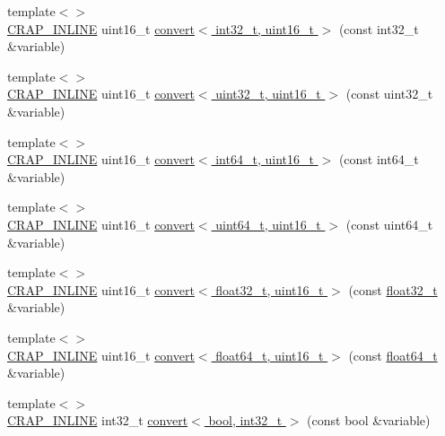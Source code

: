 \begin{DoxyCompactItemize}
\item 
{\footnotesize template$<$$>$ }\\\hyperlink{config__x86_8h_a5a40526b8d842e7ff731509998bb0f1c}{C\+R\+A\+P\+\_\+\+I\+N\+L\+I\+N\+E} uint16\+\_\+t \hyperlink{namespacecrap_ab0c5e4fcb0103590493bdf74633c99b4}{convert$<$ int32\+\_\+t, uint16\+\_\+t $>$} (const int32\+\_\+t \&variable)
\item 
{\footnotesize template$<$$>$ }\\\hyperlink{config__x86_8h_a5a40526b8d842e7ff731509998bb0f1c}{C\+R\+A\+P\+\_\+\+I\+N\+L\+I\+N\+E} uint16\+\_\+t \hyperlink{namespacecrap_a2c124aff19ec54020d9f90295ce56b55}{convert$<$ uint32\+\_\+t, uint16\+\_\+t $>$} (const uint32\+\_\+t \&variable)
\item 
{\footnotesize template$<$$>$ }\\\hyperlink{config__x86_8h_a5a40526b8d842e7ff731509998bb0f1c}{C\+R\+A\+P\+\_\+\+I\+N\+L\+I\+N\+E} uint16\+\_\+t \hyperlink{namespacecrap_a508dd2b9a4e2635d78d9ea03b7625169}{convert$<$ int64\+\_\+t, uint16\+\_\+t $>$} (const int64\+\_\+t \&variable)
\item 
{\footnotesize template$<$$>$ }\\\hyperlink{config__x86_8h_a5a40526b8d842e7ff731509998bb0f1c}{C\+R\+A\+P\+\_\+\+I\+N\+L\+I\+N\+E} uint16\+\_\+t \hyperlink{namespacecrap_a0823edb57f60d854502e8657336885c7}{convert$<$ uint64\+\_\+t, uint16\+\_\+t $>$} (const uint64\+\_\+t \&variable)
\item 
{\footnotesize template$<$$>$ }\\\hyperlink{config__x86_8h_a5a40526b8d842e7ff731509998bb0f1c}{C\+R\+A\+P\+\_\+\+I\+N\+L\+I\+N\+E} uint16\+\_\+t \hyperlink{namespacecrap_a46867334dcd3612b887bc34782c0992d}{convert$<$ float32\+\_\+t, uint16\+\_\+t $>$} (const \hyperlink{crap__types_8h_a4611b605e45ab401f02cab15c5e38715}{float32\+\_\+t} \&variable)
\item 
{\footnotesize template$<$$>$ }\\\hyperlink{config__x86_8h_a5a40526b8d842e7ff731509998bb0f1c}{C\+R\+A\+P\+\_\+\+I\+N\+L\+I\+N\+E} uint16\+\_\+t \hyperlink{namespacecrap_a188e5ce3c38547ceb32c29c98355d2ae}{convert$<$ float64\+\_\+t, uint16\+\_\+t $>$} (const \hyperlink{crap__types_8h_ac55f3ae81b5bc9053760baacf57e47f4}{float64\+\_\+t} \&variable)
\item 
{\footnotesize template$<$$>$ }\\\hyperlink{config__x86_8h_a5a40526b8d842e7ff731509998bb0f1c}{C\+R\+A\+P\+\_\+\+I\+N\+L\+I\+N\+E} int32\+\_\+t \hyperlink{namespacecrap_ae4a5dec504507fdfb398209926179fd0}{convert$<$ bool, int32\+\_\+t $>$} (const bool \&variable)

\end{DoxyCompactItemize}
